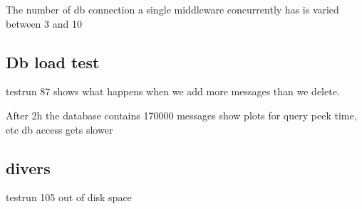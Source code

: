 \documentclass[milestone1.tex]{subfiles}
\begin{document}
The number of db connection a single middleware concurrently has is varied between 3 and 10

\subsection{Db load test}


testrun 87 shows what happens when we add more messages than we delete. 

After 2h the database contains 170000 messages
show plots for query peek time, etc
db access gets slower

\subsection{divers}

testrun 105 out of disk space
\end{document}
